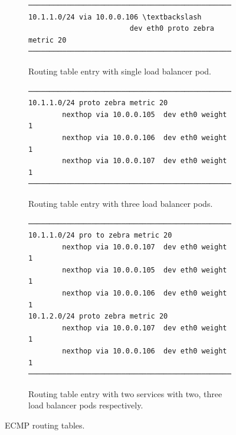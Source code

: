 \begin{figure}[tb]

\begin{subfigure}[t]{\columnwidth}
\centering
\begin{Verbatim}[commandchars=\\\{\}]
───────────────────────────────────────────────────────
10.1.1.0/24 via 10.0.0.106 \textbackslash 
                        dev eth0 proto zebra metric 20
───────────────────────────────────────────────────────
\end{Verbatim}
\caption{Routing table entry with single load balancer pod.}
\label{fig:single}
\end{subfigure}
\par\bigskip

\begin{subfigure}[t]{\columnwidth}
\centering
\begin{Verbatim}[commandchars=\\\{\}]
───────────────────────────────────────────────────────
10.1.1.0/24 proto zebra metric 20
        nexthop via 10.0.0.105  dev eth0 weight 1
        nexthop via 10.0.0.106  dev eth0 weight 1
        nexthop via 10.0.0.107  dev eth0 weight 1
───────────────────────────────────────────────────────
\end{Verbatim}
\caption{Routing table entry with three load balancer pods.}
\label{fig:three}
\end{subfigure}
\par\bigskip

\begin{subfigure}[t]{\columnwidth}
\centering
\begin{Verbatim}[commandchars=\\\{\}]
───────────────────────────────────────────────────────
10.1.1.0/24 pro to zebra metric 20
        nexthop via 10.0.0.107  dev eth0 weight 1
        nexthop via 10.0.0.105  dev eth0 weight 1
        nexthop via 10.0.0.106  dev eth0 weight 1
10.1.2.0/24 proto zebra metric 20
        nexthop via 10.0.0.107  dev eth0 weight 1
        nexthop via 10.0.0.106  dev eth0 weight 1
───────────────────────────────────────────────────────
\end{Verbatim}
\caption{Routing table entry with two services with two, three load balancer pods respectively.}
\label{fig:double_svc}
\end{subfigure}
\par\bigskip

\caption{ECMP routing tables.}
\label{fig:exabgp_routing_table}
\end{figure}

